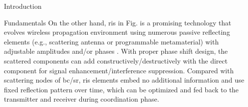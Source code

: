 \documentclass[journal]{IEEEtran}
\begin{document}
\begin{section}{Introduction}
\begin{subsection}{Fundamentals}
		On the other hand, \gls{ris} in Fig.  is a promising technology that evolves wireless propagation environment using numerous passive reflecting elements (e.g., scattering antenna or programmable metamaterial) with adjustable amplitudes and/or phases \cite{Wu2021b}.
		With proper phase shift design, the scattered components can add constructively/destructively with the direct component for signal enhancement/interference suppression.
		Compared with scattering nodes of \gls{bc}/\gls{sr}, \gls{ris} elements embed no additional information and use fixed reflection pattern over time, which can be optimized and fed back to the transmitter and receiver during coordination phase.




\end{subsection}
\end{section}
\end{document}
